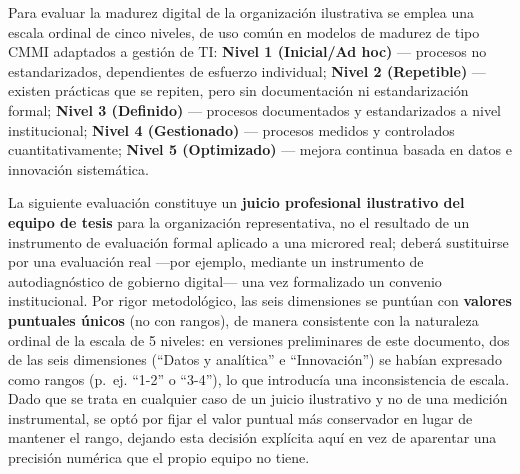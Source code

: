 \documentclass[11pt,a4paper]{article}
\begin{document}
Para evaluar la madurez digital de la organización ilustrativa se emplea una escala ordinal de cinco niveles, de uso común en modelos de madurez de tipo CMMI adaptados a gestión de TI: \textbf{Nivel 1 (Inicial/Ad hoc)} --- procesos no estandarizados, dependientes de esfuerzo individual; \textbf{Nivel 2 (Repetible)} --- existen prácticas que se repiten, pero sin documentación ni estandarización formal; \textbf{Nivel 3 (Definido)} --- procesos documentados y estandarizados a nivel institucional; \textbf{Nivel 4 (Gestionado)} --- procesos medidos y controlados cuantitativamente; \textbf{Nivel 5 (Optimizado)} --- mejora continua basada en datos e innovación sistemática.

La siguiente evaluación constituye un \textbf{juicio profesional ilustrativo del equipo de tesis} para la organización representativa, no el resultado de un instrumento de evaluación formal aplicado a una microred real; deberá sustituirse por una evaluación real ---por ejemplo, mediante un instrumento de autodiagnóstico de gobierno digital--- una vez formalizado un convenio institucional. Por rigor metodológico, las seis dimensiones se puntúan con \textbf{valores puntuales únicos} (no con rangos), de manera consistente con la naturaleza ordinal de la escala de 5 niveles: en versiones preliminares de este documento, dos de las seis dimensiones (``Datos y analítica'' e ``Innovación'') se habían expresado como rangos (p.~ej. ``1-2'' o ``3-4''), lo que introducía una inconsistencia de escala. Dado que se trata en cualquier caso de un juicio ilustrativo y no de una medición instrumental, se optó por fijar el valor puntual más conservador en lugar de mantener el rango, dejando esta decisión explícita aquí en vez de aparentar una precisión numérica que el propio equipo no tiene.
\end{document}
